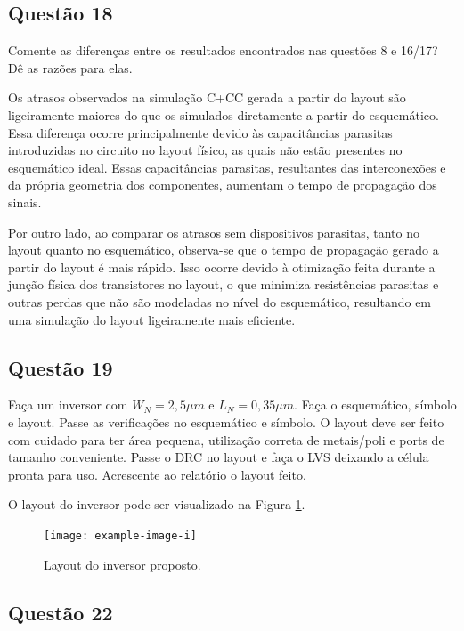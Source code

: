 \documentclass[12pt,a4paper]{article}
\begin{document}
\subsection*{Questão 18}

Comente as diferenças entre os resultados encontrados nas questões 8 e 16/17? Dê as razões para elas.

Os atrasos observados na simulação C+CC gerada a partir do layout são ligeiramente maiores do que os simulados diretamente a partir do esquemático. Essa diferença ocorre principalmente devido às capacitâncias parasitas introduzidas no circuito no layout físico, as quais não estão presentes no esquemático ideal. Essas capacitâncias parasitas, resultantes das interconexões e da própria geometria dos componentes, aumentam o tempo de propagação dos sinais.

Por outro lado, ao comparar os atrasos sem dispositivos parasitas, tanto no layout quanto no esquemático, observa-se que o tempo de propagação gerado a partir do layout é mais rápido. Isso ocorre devido à otimização feita durante a junção física dos transistores no layout, o que minimiza resistências parasitas e outras perdas que não são modeladas no nível do esquemático, resultando em uma simulação do layout ligeiramente mais eficiente.

\subsection*{Questão 19}

Faça um inversor com $W_N = 2,5 \mu m$ e $L_N = 0,35 \mu m$. Faça o esquemático, símbolo e layout. Passe as verificações no esquemático e símbolo. O layout deve ser feito com cuidado para ter área pequena, utilização correta de metais/poli e ports de tamanho conveniente. Passe o DRC no layout e faça o LVS deixando a célula pronta para uso. Acrescente ao relatório o layout feito.

O layout do inversor pode ser visualizado na Figura \ref{fig:inverter_layout}.

\begin{figure}[H]
    \centering
    \texttt{[image: example-image-i]}
    \caption{Layout do inversor proposto.}
    \label{fig:inverter_layout}
\end{figure}

\subsection*{Questão 22}
\end{document}
